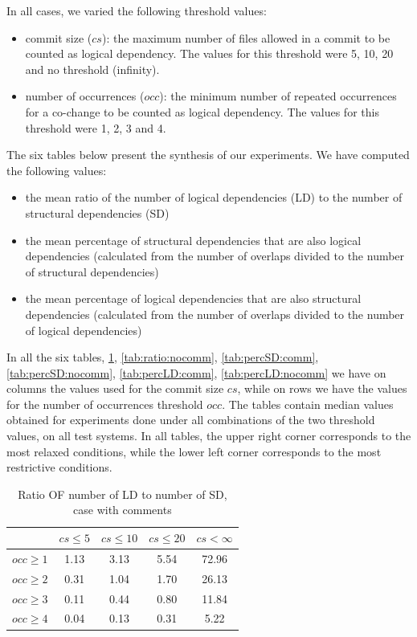 \documentclass[conference]{IEEEtran}
\begin{document}
In all cases, we varied the following threshold values: 
 \begin{itemize}
	\item commit size ($cs$): the maximum number of files allowed in a commit to be counted as logical dependency. The values for this threshold were 5, 10, 20 and no threshold (infinity).  
	\item number of occurrences ($occ$): the minimum number of repeated occurrences for a co-change to be counted as logical dependency. The values for this threshold were 1, 2, 3 and 4.  
\end{itemize}

The six tables below present the synthesis of our experiments. 
We have computed the following  values:
\begin{itemize}
	\item the mean ratio of the number of logical dependencies  (LD) to the number of structural dependencies (SD)
   \item the mean percentage of structural dependencies that are also logical dependencies (calculated from the number of overlaps divided to the number of structural dependencies)	
		\item the mean percentage of logical dependencies that are also structural dependencies (calculated from the number of overlaps divided to the number of logical dependencies)
\end{itemize}

In all the six tables, \ref{tab:ratio:comm}, \ref{tab:ratio:nocomm}, \ref{tab:percSD:comm}, \ref{tab:percSD:nocomm},
\ref{tab:percLD:comm}, \ref{tab:percLD:nocomm} we have on columns the values used for the commit size $cs$, while on rows we have the values for the number of occurrences threshold $occ$. The tables contain median values obtained for experiments done under all combinations of the two threshold values, on all test systems. In all tables, the upper right corner corresponds to the most relaxed conditions, while the lower left corner corresponds to the most restrictive conditions.


\begin{table}[!h]
\renewcommand{\arraystretch}{1.25}
\caption{Ratio OF number of LD to number of SD, case with comments}
\label{tab:ratio:comm}
\centering

\begin{tabular}{|c|c|c|c|c|}
\hline
	      &	$cs\leq 5$	&	$cs\leq 10$	&	$cs\leq 20$	&	$cs<\infty$	\\
\hline
$occ\geq 1$	&	1.13	&	3.13	&	5.54	&	72.96	\\
$occ\geq 2$	&	0.31	&	1.04	&	1.70	&	26.13	\\
$occ\geq 3$	&	0.11	&	0.44	&	0.80	&	11.84	\\
$occ\geq 4$	&	0.04	&	0.13	&	0.31	&	5.22	\\
\hline
\end{tabular}
\end{table}
\end{document}
